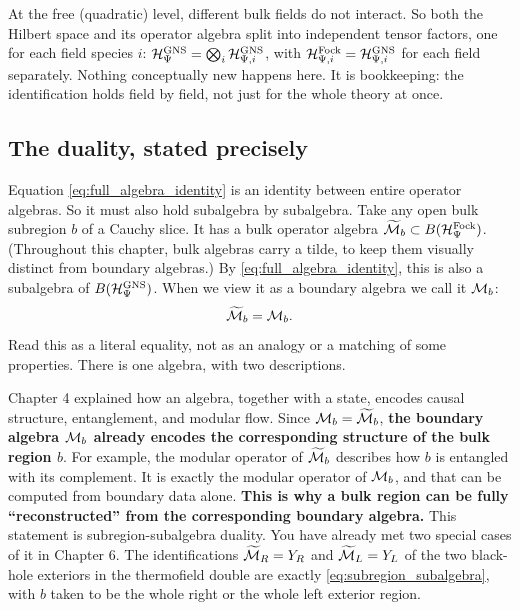 At the free (quadratic) level, different bulk fields do not interact. So both the Hilbert space and its
operator algebra split into independent tensor factors, one for each field species $i$:
$\mathcal{H}_\Psi^{\text{GNS}}=\bigotimes_i\mathcal{H}_{\Psi,i}^{\text{GNS}}$, with $\mathcal{H}_{\Psi,i}^{\text{Fock}}=
\mathcal{H}_{\Psi,i}^{\text{GNS}}$ for each field separately. Nothing conceptually new happens here. It is
bookkeeping: the identification holds field by field, not just for the whole theory at once.

\subsection*{The duality, stated precisely}

Equation \eqref{eq:full_algebra_identity} is an identity between entire operator algebras. So it must also
hold subalgebra by subalgebra. Take any open bulk subregion $b$ of a Cauchy slice. It has a bulk operator
algebra $\widetilde{\mathcal{M}}_b \subset B(\mathcal{H}_\Psi^{\text{Fock}})$. (Throughout this chapter, bulk algebras carry a
tilde, to keep them visually distinct from boundary algebras.) By \eqref{eq:full_algebra_identity}, this is
also a subalgebra of $B(\mathcal{H}_\Psi^{\text{GNS}})$. When we view it as a boundary algebra we call it $\mathcal{M}_b$:
\begin{equation}
\widetilde{\mathcal{M}}_b = \mathcal{M}_b .
\label{eq:subregion_subalgebra}
\end{equation}
Read this as a literal equality, not as an analogy or a matching of some properties. There is one algebra,
with two descriptions.

Chapter 4 explained how an algebra, together with a state, encodes causal structure, entanglement, and
modular flow. Since $\mathcal{M}_b=\widetilde{\mathcal{M}}_b$, \textbf{the boundary algebra $\mathcal{M}_b$ already encodes the
corresponding structure of the bulk region $b$}. For example, the modular operator of $\widetilde{\mathcal{M}}_b$
describes how $b$ is entangled with its complement. It is exactly the modular operator of $\mathcal{M}_b$, and that
can be computed from boundary data alone. \textbf{This is why a bulk region can be fully ``reconstructed''
from the corresponding boundary algebra.} This statement is subregion-subalgebra duality. You have already
met two special cases of it in Chapter 6. The identifications $\widetilde{\mathcal{M}}_R=Y_R$ and $\widetilde{\mathcal{M}}_L=Y_L$
of the two black-hole exteriors in the thermofield double are exactly \eqref{eq:subregion_subalgebra}, with
$b$ taken to be the whole right or the whole left exterior region.

